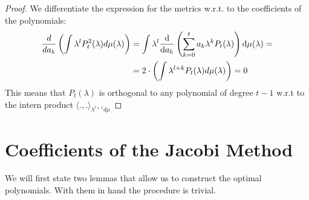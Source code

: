 \documentclass{article}
\begin{document}
\optimality*
\begin{proof}
We differentiate the expression for the metrics w.r.t. to the coefficients of the polynomials:
\begin{align*}
    \frac{d}{da_k}\left(\int \lambda^lP_t^2(\lambda)d\mu(\lambda)\right)&=\int\lambda^l\frac{\mathop{}\!\mathrm{d}}{\mathop{}\!\mathrm{d} a_k}\left(\sum_{k=0}^t a_k\lambda^kP_t(\lambda) \right) \mathop{}\!\mathrm{d} \mu(\lambda)=
    \\&=2\cdot\left(\int \lambda^{l+k}P_t(\lambda)d\mu(\lambda)\right)=0
\end{align*}
This means that $P_t(\lambda)$ is orthogonal to any polynomial of degree $t-1$  w.r.t to the intern product $\langle.,.\rangle_{\lambda^{l+1}d\mu}$

\end{proof}

\section{Coefficients  of the Jacobi Method}
We will first state two lemmas that allow us to construct the optimal polynomials. With them in hand the procedure is trivial.
\end{document}
